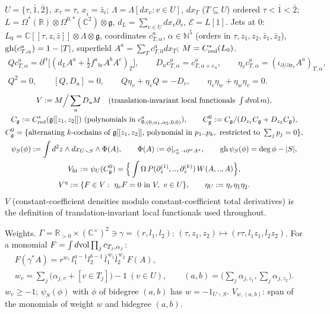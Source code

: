 \documentclass[10pt,a4paper]{article}
\numberwithin{equation}{section}
\theoremstyle{definition}
\theoremstyle{remark}
\newcommand{\g}{\mathfrak g}
\newcommand{\zb}{\bar z}
\newcommand{\Vht}{V_{\rm ht}}
\newcommand{\Veta}{V^{\eta}}
\newcommand{\Cg}{C^0_{\g}}
\begin{document}
$U=\{\tau,\bar1,\bar2\}$, $x_\tau=\tau$, $x_{\bar i}=\zb_i$; $\Lambda=\Lambda[dx_v:v\in U]$, $dx_T$ ($T\subseteq U$) ordered $\tau<\bar1<\bar2$; $L=\Omega^*(\mathbb R)\otimes\Omega^{0,*}(\mathbb C^2)\otimes\g$, $d_L=\sum_{v\in U}dx_v\partial_v$, $\mathcal E=L[1]$. Jets at $0$: $L_0=\mathbb C[[\tau,z,\zb]]\otimes\Lambda\otimes\g$, coordinates $c^a_{T,\alpha}$, $\alpha\in\mathbb N^5$ (orders in $\tau,z_1,z_2,\zb_1,\zb_2$), ${\rm gh}(c^a_{T,\alpha})=1-|T|$, superfield $A^a=\sum_Tc^a_{T,0}dx_T$; $M=C^*_{\rm red}(L_0)$.
\begin{gather}
Qc^a_{T,\alpha}=\partial^\alpha\big[(d_LA^a+\tfrac12f^a{}_{bc}A^bA^c)_T\big],\qquad D_uc^a_{T,\alpha}=c^a_{T,\alpha+e_u},\qquad \eta_vc^a_{T,\alpha}=(\iota_{\partial/\partial x_v}A^a)_{T,\alpha},\label{eq-jetops}\\
Q^2=0,\qquad[Q,D_u]=0,\qquad Q\eta_v+\eta_vQ=-D_v,\qquad \eta_v\eta_w+\eta_w\eta_v=0 .\label{eq-jetid}
\end{gather}
\begin{gather}
V:=M\Big/\sum_uD_uM\quad(\text{translation-invariant local functionals }\textstyle\int d{\rm vol}\,m),\notag\\
C_\g:=C^*_{\rm red}(\g[[z_1,z_2]])\ (\text{polynomials in }c^a_{\emptyset,(0,\alpha_1,\alpha_2,0,0)}),\qquad \Cg:=C_\g/(D_{z_1}C_\g+D_{z_2}C_\g),\notag\\
\Cg=\{\text{alternating }k\text{-cochains of }\g[[z_1,z_2]]\text{, polynomial in }p_1..p_k,\ \text{restricted to }\textstyle\sum_jp_j=0\},\label{eq-C0}\\
\psi_S(\phi):=\int d^2z\wedge dx_{U\smallsetminus S}\wedge\Phi(A),\qquad \Phi(A):=\phi|_{c^a_\alpha\to\partial^\alpha A^a},\qquad {\rm gh}\,\psi_S(\phi)=\deg\phi-|S|,\notag\\
\Vht:=\psi_U(\Cg)=\Big\{\int\Omega\,P(\partial_z^{(1)},..,\partial_z^{(k)})\,W(A,..,A)\Big\},\notag\\
\Veta:=\{F\in V:\ \eta_vF=0\text{ in }V,\ v\in U\},\qquad \eta_U:=\eta_\tau\eta_{\bar1}\eta_{\bar2}.\notag
\end{gather}
$V$ (constant-coefficient densities modulo constant-coefficient total derivatives) is the definition of translation-invariant local functionals used throughout.

Weights. $\Gamma=\mathbb R_{>0}\times(\mathbb C^\times)^2\ni\gamma=(r,l_1,l_2)$: $(\tau,z_1,z_2)\mapsto(r\tau,l_1z_1,l_2z_2)$. For a monomial $F=\int d{\rm vol}\prod_jc_{T_j,\alpha_j}$:
\begin{equation}
\begin{gathered}
F(\gamma^*A)=r^{w_\tau}\,l_1^{a-1}l_2^{b-1}\,\bar l_1^{\,w_{\bar1}}\bar l_2^{\,w_{\bar2}}\,F(A),\\
w_v=\sum_j\big(\alpha_{j,v}+[v\in T_j]\big)-1\ (v\in U),\qquad (a,b)=\Big(\sum_j\alpha_{j,z_1},\sum_j\alpha_{j,z_2}\Big).
\end{gathered}\label{eq-weights}
\end{equation}
$w_v\ge-1$; $\psi_S(\phi)$ with $\phi$ of bidegree $(a,b)$ has $w=-1_{U\smallsetminus S}$. $V_{w,(a,b)}$: span of the monomials of weight $w$ and bidegree $(a,b)$.
\end{document}
